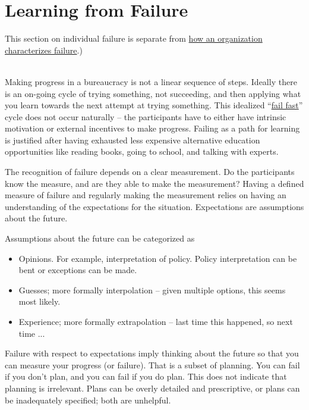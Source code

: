 \section{Learning from Failure\label{sec:learn-from-failure}}

This section on individual failure is separate from %
\hyperref[sec:org-failure-and-success]{how an organization characterizes failure}.)

\ \\

Making progress in a bureaucracy is not a linear sequence of steps. Ideally there is an on-going cycle of trying something, not succeeding, and then applying what you learn towards the next attempt at trying something. This idealized ``\href{https://en.wikipedia.org/wiki/Fail-fast#Business}{fail fast}'' cycle does not occur naturally -- the participants have to either have intrinsic motivation or external incentives to make progress. Failing as a path for learning is justified after having exhausted less expensive alternative education opportunities like reading books, going to school, and talking with experts. 

The recognition of failure depends on a clear measurement. Do the participants know the measure, and are they able to make the measurement? Having a defined measure of failure and regularly making the measurement relies on having an understanding of the expectations for the situation. Expectations are assumptions about the future.

Assumptions about the future can be categorized as
\begin{itemize}
    \item Opinions. For example, interpretation of policy. Policy interpretation can be bent or exceptions can be made. 
    \item Guesses; more formally interpolation -- given multiple options, this seems most likely.
    \item Experience; more formally extrapolation -- last time this happened, so next time ...
\end{itemize}

Failure with respect to expectations imply thinking about the future so that you can measure your progress (or failure). That is a subset of planning. You can fail if you don't plan, and you can fail if you do plan. This does not indicate that planning is irrelevant. Plans can be overly detailed and prescriptive, or plans can be inadequately specified; both are unhelpful.


